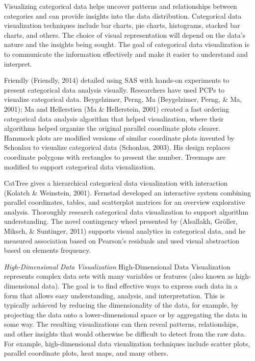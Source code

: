 \documentclass[print]{nuthesis}
\begin{document}
Visualizing categorical data helps uncover patterns and relationships between categories and can provide insights into the data distribution. Categorical data visualization techniques include bar charts, pie charts, histograms, stacked bar charts, and others. The choice of visual representation will depend on the data's nature and the insights being sought. The goal of categorical data visualization is to communicate the information effectively and make it easier to understand and interpret.

Friendly (Friendly, 2014) detailed using SAS with hands-on experiments to present categorical data analysis visually. Researchers have used PCPs to visualize categorical data. Beygelzimer, Perng, Ma (Beygelzimer, Perng, \& Ma, 2001); Ma and Hellerstien (Ma \& Hellerstein, 2001) created a fast ordering categorical data analysis algorithm that helped visualization, where their algorithms helped organize the original parallel coordinate plots clearer. Hammock plots are modified versions of similar coordinate plots invented by Schonlau to visualize categorical data (Schonlau, 2003). His design replaces coordinate polygons with rectangles to present the number. Treemaps are modified to support categorical data visualization.

CatTree gives a hierarchical categorical data visualization with interaction (Kolatch \& Weinstein, 2001). Fernstad developed an interactive system combining parallel coordinates, tables, and scatterplot matrices for an overview explorative analysis. Thoroughly research categorical data visualization to support algorithm understanding. The novel contingency wheel presented by (Alsallakh, Gröller, Miksch, \& Suntinger, 2011) supports visual analytics in categorical data, and he measured association based on Pearson's residuals and used visual abstraction based on elements frequency.

\emph{High-Dimensional Data Visualization}
High-Dimensional Data Visualization represents complex data sets with many variables or features (also known as high-dimensional data). The goal is to find effective ways to express such data in a form that allows easy understanding, analysis, and interpretation. This is typically achieved by reducing the dimensionality of the data, for example, by projecting the data onto a lower-dimensional space or by aggregating the data in some way. The resulting visualizations can then reveal patterns, relationships, and other insights that would otherwise be difficult to detect from the raw data. For example, high-dimensional data visualization techniques include scatter plots, parallel coordinate plots, heat maps, and many others.
\end{document}
